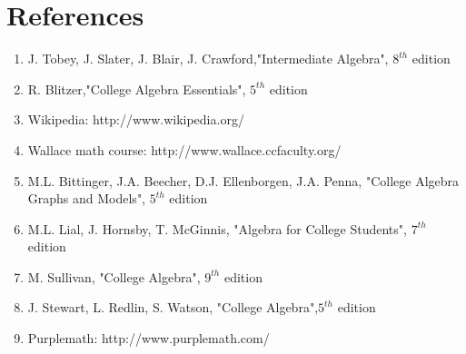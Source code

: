 
\chapter{References}
%
\thispagestyle{empty}
%
\begin{enumerate}
	\item	J. Tobey, J. Slater, J. Blair, J. Crawford,"Intermediate Algebra", $8^{th}$ edition
	\item R. Blitzer,"College Algebra Essentials", $5^{th}$ edition
	\item Wikipedia: http://www.wikipedia.org/
	\item Wallace math course: http://www.wallace.ccfaculty.org/	
	\item M.L. Bittinger, J.A. Beecher, D.J. Ellenborgen, J.A. Penna, "College Algebra Graphs and Models", $5^{th}$ edition
	\item M.L. Lial, J. Hornsby, T. McGinnis, "Algebra for College Students", $7^{th}$ edition
	\item M. Sullivan, "College Algebra", $9^{th}$ edition
	\item J. Stewart, L. Redlin, S. Watson, "College Algebra",$5^{th}$ edition
	\item Purplemath: http://www.purplemath.com/
\end{enumerate}